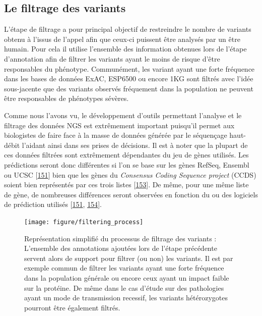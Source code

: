 \documentclass[12pt,twoside]{reedthesis}
\theoremstyle{definition}
\theoremstyle{definition}
\theoremstyle{remark}
\begin{document}
  \newpage
  
  \subsection{Le filtrage des variants}\label{le-filtrage-des-variants}
  
  L'étape de filtrage a pour principal objectif de restreindre le nombre
  de variants obtenu à l'issus de l'appel afin que ceux-ci puissent être
  analysés par un être humain. Pour cela il utilise l'ensemble des
  information obtenues lors de l'étape d'annotation afin de filtrer les
  variants ayant le moins de risque d'être responsables du phénotype.
  Communément, les variant ayant une forte fréquence dans les bases de
  données ExAC, ESP6500 ou encore 1KG sont filtrés avec l'idée
  sous-jacente que des variants observés fréquement dans la population ne
  peuvent être responsables de phénotypes sévères.
  
  Comme nous l'avons vu, le développement d'outils permettant l'analyse et
  le filtrage des données NGS est extrêmement important puisqu'il permet
  aux biologistes de faire face à la masse de données générée par le
  séquençage haut-débit l'aidant ainsi dans ses prises de décisions. Il
  est à noter que la plupart de ces données filtrées sont extrêmement
  dépendantes du jeu de gènes utilisés. Les prédictions seront donc
  différentes si l'on se base sur les gènes RefSeq, Ensembl ou UCSC
  {[}\protect\hyperlink{ref-McCarthy2014}{151}{]} bien que les gènes du
  \emph{Consensus Coding Sequence project} (CCDS) soient bien représentés
  par ces trois listes {[}\protect\hyperlink{ref-Pruitt2009}{153}{]}. De
  même, pour une même liste de gène, de nombreuses différences seront
  observées en fonction du ou des logiciels de prédiction utilisés
  {[}\protect\hyperlink{ref-McCarthy2014}{151},
  \protect\hyperlink{ref-Salgado2016}{154}{]}.
  
  \begin{figure}
  
  {\centering \texttt{[image: figure/filtering\_process]} 
  
  }
  
  \caption[Représentation simplifié du processus de filtrage des variants]{Représentation simplifié du processus de filtrage des variants : L'ensemble des annotations ajoutées lors de l'étape précédente servent alors de support pour filtrer (ou non) les variants. Il est par exemple commun de filtrer les variants ayant une forte fréquence dans la population générale ou encore ceux ayant un impact faible sur la protéine. De même dans le cas d'étude sur des pathologies ayant un mode de transmission recessif, les variants hétérozygotes pourront être également filtrés.}\label{fig:pictfilter}
  \end{figure}
  
\end{document}
